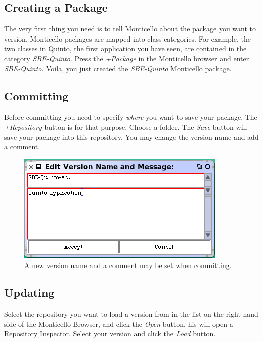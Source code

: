 \documentclass[a4paper,10pt,twoside]{book}
\begin{document}
\subsection{Creating a Package}

The very first thing you need is to tell Monticello about the package you want to version. Monticello packages are mapped into class categories. For example, the two classes in Quinto, the first application you have seen, are contained in the category \emph{SBE-Quinto}. Press the \emph{+Package} in the Monticello browser and enter \emph{SBE-Quinto}. Voila, you just created the \emph{SBE-Quinto} Monticello package. 

\subsection{Committing}

Before committing you need to specify \emph{where} you want to save your package. The \emph{+Repository} button is for that purpose. Choose a folder. The \emph{Save} button will save your package into this repository. You may change the version name and add a comment. 

\begin{figure}[ht]\centering
	\includegraphics[width=.55\linewidth]{saving.png}
	\caption{A new version name and a comment may be set when committing.}
\end{figure}

\subsection{Updating}

Select the repository you want to load a version from in the list on the right-hand side of the Monticello Browser, and click the \emph{Open} button. his will open a Repository Inspector. Select your version and click the \emph{Load} button.

\end{document}
